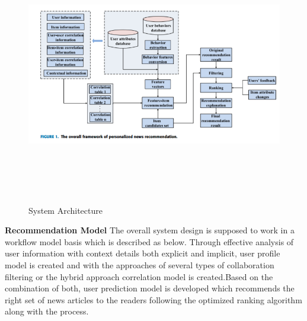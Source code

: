    \begin{center}
  \begin{figure}[h!]
   \includegraphics[scale=0.7,width=7in,height=4.5in]{images/systemdesign.PNG}
    \caption{System Architecture}
    \end{figure}
    \end{center}
    
\textbf{Recommendation Model}\newline
The overall system design is supposed to work in a workflow model basis which is described as below. Through effective analysis of user information with context details both explicit and implicit, user profile model is created and with the approaches of several types of collaboration filtering or the hybrid approach correlation model is created.Based on the combination of both, user prediction model is developed which recommends the right set of news articles to the readers following the optimized ranking algorithm along with the process. 

